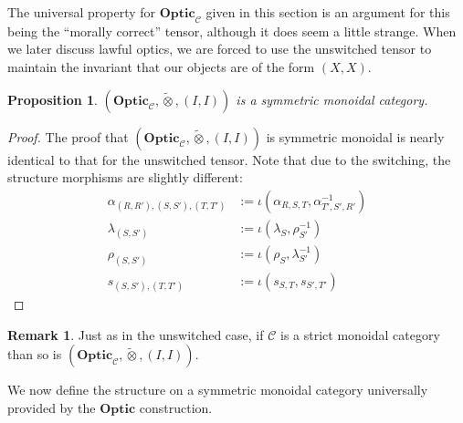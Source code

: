 \documentclass[11pt,letterpaper]{article}
\theoremstyle{plain}
\newtheorem{proposition}[theorem]{Proposition}
\theoremstyle{definition}
\newtheorem{remark}[theorem]{Remark}
\newcommand{\C}{\mathscr{C}}
\newcommand{\Optic}{\mathbf{Optic}}
\newcommand{\switched}{\mathbin{\tilde{\otimes}}}
\newcommand{\id}{\mathrm{id}}
\begin{document}
The universal property for $\Optic_\C$ given in this section is an argument for this being the ``morally correct'' tensor, although it does seem a little strange. When we later discuss lawful optics, we are forced to use the unswitched tensor to maintain the invariant that our objects are of the form $(X, X)$.

\begin{proposition}
  $(\Optic_\C, \switched, (I, I))$ is a symmetric monoidal category. 
\end{proposition}
\begin{proof}
  The proof that $(\Optic_\C, \switched, (I, I))$ is symmetric monoidal is nearly identical to that for the unswitched tensor. Note that due to the switching, the structure morphisms are slightly different:
  \begin{align*}
    \alpha_{(R, R'), (S, S'), (T, T')} &:= \iota(\alpha_{R,S,T}, \alpha_{T',S',R'}^{-1}) \\
    \lambda_{(S, S')} &:= \iota(\lambda_{S}, \rho_{S'}^{-1}) \\
    \rho_{(S, S')} &:= \iota(\rho_{S}, \lambda_{S'}^{-1}) \\
    s_{(S, S'), (T, T')} &:= \iota(s_{S, T}, s_{S', T'})
  \end{align*}

\end{proof}

\begin{remark}
  Just as in the unswitched case, if $\C$ is a strict monoidal category than so is $(\Optic_\C, \switched, (I, I))$.
\end{remark}

We now define the structure on a symmetric monoidal category universally provided by the $\Optic$ construction.
\end{document}
